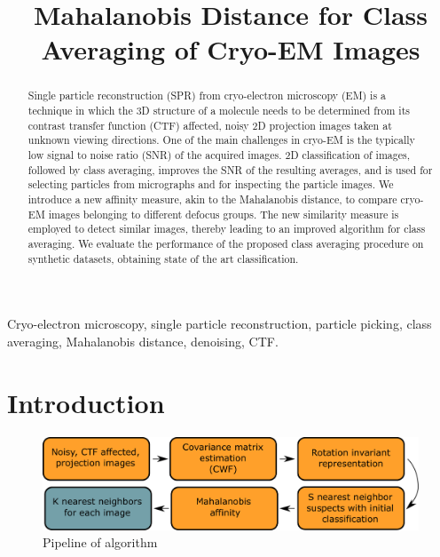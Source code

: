 \documentclass{article}
\title{Mahalanobis Distance for Class Averaging of Cryo-EM Images}
\begin{document}
%
\maketitle
%
\begin{abstract}
Single particle reconstruction (SPR) from cryo-electron microscopy (EM) is a technique in which the 3D structure of a molecule needs to be determined from its contrast transfer function (CTF) affected, noisy 2D projection images taken at unknown viewing directions. One of the main challenges in cryo-EM is the typically low signal to noise ratio (SNR) of the acquired images. 2D classification of images, followed by class averaging, improves the SNR of the resulting averages, and is used for selecting particles from micrographs and for inspecting the particle images. We introduce a new affinity measure, akin to the Mahalanobis distance, to compare cryo-EM images belonging to different defocus groups. The new similarity measure is employed to detect similar images, thereby leading to an improved algorithm for class averaging. We evaluate the performance of the proposed class averaging procedure on synthetic datasets, obtaining state of the art classification. 
\end{abstract}
%
\begin{keywords}
Cryo-electron microscopy, single particle reconstruction, particle picking, class averaging, Mahalanobis distance, denoising, CTF.
\end{keywords}
%
	
\section{Introduction}
\label{sec:intro}
\begin{figure}
\begin{center}
\vspace{-.2in}
\includegraphics[width=\columnwidth]{pipeline.pdf}
\vspace{-.2in}
\caption{Pipeline of algorithm}\label{fig:pipeline}
\end{center}
\vspace{-.2in}
\end{figure}
 
\end{document}
